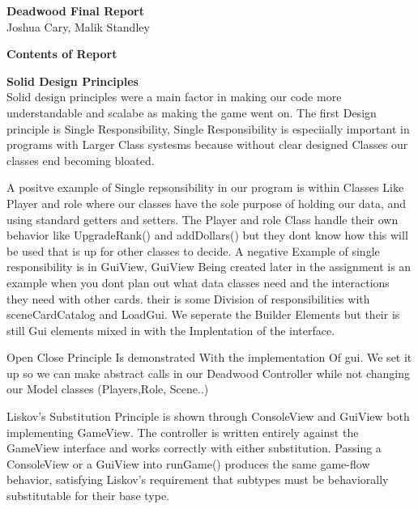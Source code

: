 \documentclass[12pt]{article}
\begin{document}
\setlength{\parindent}{10pt}
\setcounter{page}{1}
\singlespacing 

\begin{center}
\textbf{Deadwood Final Report}\\
Joshua Cary, Malik Standley
\end{center}
\doublespacing

\textbf{Contents of Report}
\begin{list}{}{}
\item[Solid Design Principles.] 
\item[Object Oriented Principles.]
\item[Design Patterns.]
\end{list}

\textbf {Solid Design Principles} \\

Solid design principles were a main factor in making our code more understandable and scalabe as making the game went on. 
	The first Design principle is Single Responsibility, Single Responsibility is especiially important in programs with Larger Class systesms because without clear designed Classes our classes end becoming bloated.
	
	 A positve example of Single repsonsibility in our program is within Classes Like Player and role where our classes have the sole purpose of holding our data, and using standard getters and setters. The Player and role Class handle their own behavior like UpgradeRank() and addDollars() but they dont know how this will be used that is up for other classes to decide. A negative Example of single responsibility is in GuiView, GuiView Being created later in the assignment is an example when you dont plan out what data classes need and the interactions they need with other cards. their is some Division of responsibilities with sceneCardCatalog and LoadGui. We seperate the Builder Elements but their is still Gui elements mixed in with the Implentation of the interface.
	
	 Open Close Principle Is demonstrated With the implementation Of gui. We set it up so we can make abstract calls in our Deadwood Controller while not changing our Model classes (Players,Role, Scene..) 

Liskov's Substitution Principle is shown through ConsoleView and GuiView both implementing GameView. The controller is written entirely against the GameView interface and works correctly with either substitution. Passing a ConsoleView or a GuiView into runGame() produces the same game-flow behavior, satisfying Liskov's requirement that subtypes must be behaviorally substitutable for their base type.
\end{document}
